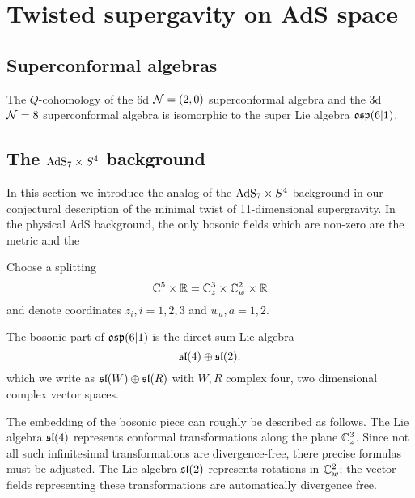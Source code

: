 \section{Twisted supergavity on AdS space}


\subsection{Superconformal algebras}

\begin{prop}
The $Q$-cohomology of the 6d $\mathcal N=(2,0)$ superconformal algebra and the 3d $\mathcal N=8$ superconformal algebra is isomorphic to the super Lie algebra $\mathfrak{osp}(6|1)$. 
\end{prop} 

\subsection{The ${\rm AdS}_7 \times S^4$ background}

In this section we introduce the analog of the ${\rm AdS}_7 \times S^4$ background in our conjectural description of the minimal twist of 11-dimensional supergravity. 
In the physical AdS background, the only bosonic fields which are non-zero are the metric and the 

\parsec[]

Choose a splitting 
\[
\mathbb C^5 \times \mathbb R = \mathbb C_z^3 \times \mathbb C_w^2 \times \mathbb R
\]
and denote coordinates $z_i, i=1,2,3$ and $w_a, a=1,2$.

The bosonic part of $\mathfrak{osp}(6|1)$ is the direct sum Lie algebra
\[
\mathfrak{sl}(4) \oplus \mathfrak{sl}(2) .
\]
which we write as $\mathfrak{sl}(W) \oplus \mathfrak{sl}(R)$ with $W,R$ complex four, two dimensional complex vector spaces. 

The embedding of the bosonic piece can roughly be described as follows. 
The Lie algebra $\mathfrak{sl}(4)$ represents conformal transformations along the plane $\mathbb C^3_z$.
Since not all such infinitesimal transformations are divergence-free, there precise formulas must be adjusted.   
The Lie algebra $\mathfrak{sl}(2)$ represents rotations in $\mathbb C^2_w$; the vector fields representing these transformations are automatically divergence free.


